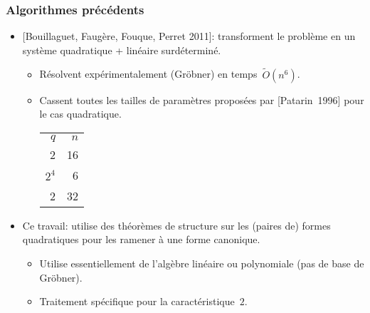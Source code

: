 \documentclass{beamer}%
\makeatletter
\let\CT@tablecolor\@empty
\def\tablecolor#1{\def\CT@tablecolor{#1}}
\makeatother
\begin{document}
\begin{frame}\frametitle{Algorithmes précédents}%

\begin{itemize}
\item{} [Bouillaguet, Faugère, Fouque, Perret 2011]: transforment le
problème en un système quadratique + linéaire surdéterminé.
\begin{itemize}
\item Résolvent expérimentalement (Gröbner) en temps~$\widetilde O(n^6)$.
\item Cassent toutes les tailles de paramètres proposées par
[Patarin~1996] pour le cas quadratique.
\def\arraystretch{1.2}\tablecolor{bleu!20}
\def\w{\color{white}}\def\.{\hphantom{.}}\def\0{\hphantom{0}}
\par\hfil\begin{tabular}{rr}
\rowcolor{bleu!80}\w $q$ & \w $n$\\
2 & 16\\
$2^4$ & 6\\
2 & 32\\
\end{tabular}
\end{itemize}
\item Ce travail: utilise des théorèmes de structure sur les (paires de)
formes quadratiques pour les ramener à une forme canonique.
\begin{itemize}
\item Utilise essentiellement de l'algèbre linéaire ou polynomiale (pas
de base de Gröbner).
\item Traitement spécifique pour la caractéristique~$2$.
\end{itemize}
\end{itemize}
\end{frame}%
\end{document}
